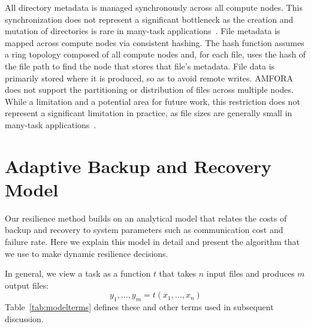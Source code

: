 \documentclass{sig-alternate}
\newcommand{\kylenote}[1]{{\textcolor{orange}    { ***Kyle:      #1 }}}
\newcommand{\kylenote}[1]{}
\begin{document}
All directory metadata is managed synchronously across all compute nodes. This synchronization does not represent
a significant bottleneck as the creation 
and mutation of directories is rare in many-task applications~\cite{MTC-Bluewaters}.
File metadata is mapped across compute nodes via consistent hashing. 
The hash function assumes a ring topology composed of all compute nodes and, for each file,
uses the hash of the file path to find the node that stores that file's metadata.
File data is primarily stored where it is produced, so as to avoid remote writes. AMFORA does not
support the partitioning or distribution of files across multiple nodes. While a limitation and 
a potential area for future work, this restriction does not represent a significant limitation in practice, as file sizes are generally
small in many-task applications~\cite{MTC-Bluewaters}. 





\section{Adaptive Backup and Recovery Model}
\label{sec:Model}

Our resilience method builds on an analytical model that relates the costs of backup and recovery to system parameters
such as communication cost and failure rate.
Here we explain this model in detail and present the algorithm that we use to make dynamic resilience decisions. 

In general, we view a task as a function $t$ that takes $n$ input files and produces $m$ output files:
\begin{equation}
y_{1}, \ldots, y_{m} = t(x_{1}, \ldots, x_{n})
\end{equation}
%
Table~\ref{tab:modelterms} defines these and other terms used in subsequent discussion.
\end{document}
